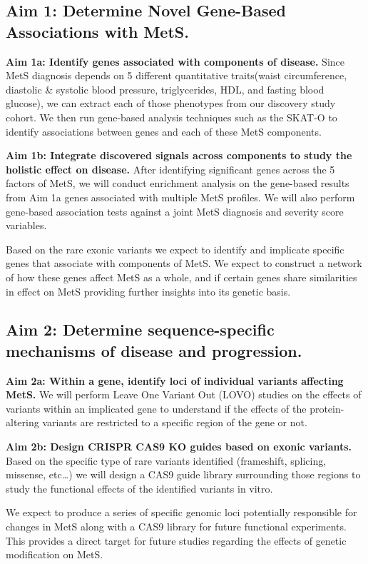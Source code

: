 \documentclass[11pt]{article}
\begin{document}
\subsection*{Aim 1: Determine Novel Gene-Based Associations with MetS.}

\textbf{Aim 1a: Identify genes associated with components of disease.} Since MetS diagnosis depends on 5 different quantitative traits(waist circumference, diastolic \& systolic blood pressure, triglycerides, HDL, and fasting blood glucose), we can extract each of those phenotypes from our discovery study cohort. We then run gene-based analysis techniques such as the SKAT-O to identify associations between genes and each of these MetS components.

\textbf{Aim 1b: Integrate discovered signals across components to study the holistic effect on disease.} After identifying significant genes across the 5 factors of MetS, we will conduct enrichment analysis on the gene-based results from Aim 1a genes associated with multiple MetS profiles. We will also perform gene-based association tests against a joint MetS diagnosis and severity score variables.

Based on the rare exonic variants we expect to identify and implicate specific genes that associate with components of MetS. We expect to construct a network of how these genes affect MetS as a whole, and if certain genes share similarities in effect on MetS providing further insights into its genetic basis.

\subsection*{Aim 2: Determine sequence-specific mechanisms of disease and progression.}

\textbf{Aim 2a: Within a gene, identify loci of individual variants affecting MetS.} We will perform Leave One Variant Out (LOVO) studies on the effects of variants within an implicated gene to understand if the effects of the protein-altering variants are restricted to a specific region of the gene or not.

\textbf{Aim 2b: Design CRISPR CAS9 KO guides based on exonic variants.} Based on the specific type of rare variants identified (frameshift, splicing, missense, etc…) we will design a CAS9 guide library surrounding those regions to study the functional effects of the identified variants in vitro.

We expect to produce a series of specific genomic loci potentially responsible for changes in MetS along with a CAS9 library for future functional experiments. This provides a direct target for future studies regarding the effects of genetic modification on MetS.
\end{document}
